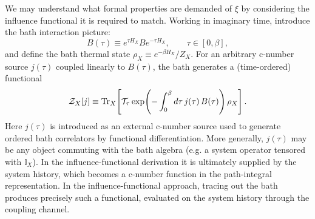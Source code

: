 We may understand what formal properties are demanded of $\xi$ by considering the influence functional it is required to match. Working in imaginary time, introduce the bath interaction picture: 
\begin{equation}
    B(\tau) \equiv e^{\tau H_X} B e^{-\tau H_X},\qquad \tau\in[0,\beta],
\end{equation}
and define the bath thermal state $\rho_X \equiv e^{-\beta H_X}/Z_X$.
For an arbitrary c-number source $j(\tau)$ coupled linearly to $B(\tau)$, the bath generates a
(time-ordered) functional
\begin{equation}
    \mathcal Z_X[j]
    \equiv \mathrm{Tr}_X\!\left[\mathcal T_\tau \exp\!\left(-\int_0^\beta d\tau\, j(\tau)\,B(\tau)\right)\rho_X\right].
    \label{eq:bath_generating_functional}
\end{equation}
Here $j(\tau)$ is introduced as an external c-number source used to generate ordered bath correlators by functional differentiation.  More generally, $j(\tau)$ may be any object commuting with the bath algebra (e.g. a system operator tensored with $\mathbb I_X$). In the influence-functional derivation it is ultimately supplied by the system history, which becomes a c-number function in the path-integral representation. In the influence-functional approach, tracing out the bath produces precisely such a functional, evaluated on the system history through the coupling channel. 

